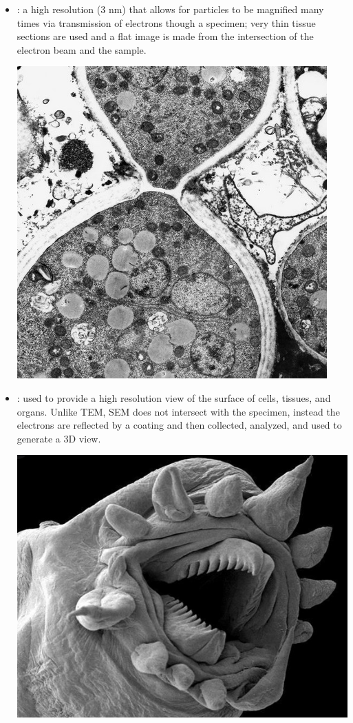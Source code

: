 \begin{itemize}
\begin{center}
  \end{center}
  \newpage
  \item {}: a high resolution (3 nm) that allows for particles to be magnified many times via transmission of electrons though a specimen; very thin tissue sections are used and a flat image is made from the intersection of the electron beam and the sample.
  \begin{center}
    \includegraphics[scale=0.60]{images/week-1-1g.jpg}
  \end{center}
  \item {}: used to provide a high resolution view of the surface of cells, tissues, and organs. Unlike TEM, SEM does not intersect with the specimen, instead the electrons are reflected by a coating and then collected, analyzed, and used to generate a 3D view.
  \begin{center}
    \includegraphics[scale=0.60]{images/week-1-1f.jpg}
  \end{center}
\end{itemize}
\clearpage
